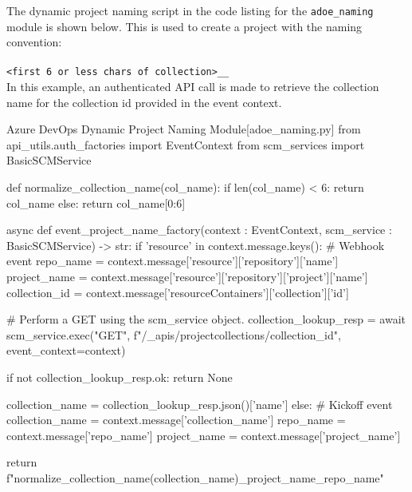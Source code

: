 The dynamic project naming script in the code listing for the \texttt{adoe\_naming}
module is shown below.  This is used to create a project with the naming convention:\\\\
\texttt{<first 6 or less chars of collection>\_<project name>\_<repo name>}\\

In this example, an authenticated API call is made to retrieve the collection name
for the collection id provided in the event context.

\begin{code}{Azure DevOps Dynamic Project Naming Module}{[adoe\_naming.py]}{}
from api_utils.auth_factories import EventContext
from scm_services import BasicSCMService

def normalize_collection_name(col_name):
    if len(col_name) < 6:
      return col_name
    else:
      return col_name[0:6]

async def event_project_name_factory(context : EventContext, scm_service : BasicSCMService) -> str:
  if 'resource' in context.message.keys():
    # Webhook event
    repo_name = context.message['resource']['repository']['name']
    project_name = context.message['resource']['repository']['project']['name']
    collection_id = context.message['resourceContainers']['collection']['id']

    # Perform a GET using the scm_service object.
    collection_lookup_resp = await scm_service.exec("GET", f"/_apis/projectcollections/{collection_id}", event_context=context)

    if not collection_lookup_resp.ok:
      return None

    collection_name = collection_lookup_resp.json()['name']
  else:
    # Kickoff event
    collection_name = context.message['collection_name']
    repo_name = context.message['repo_name']
    project_name = context.message['project_name']

  return f"{normalize_collection_name(collection_name)}_{project_name}_{repo_name}"
\end{code}
